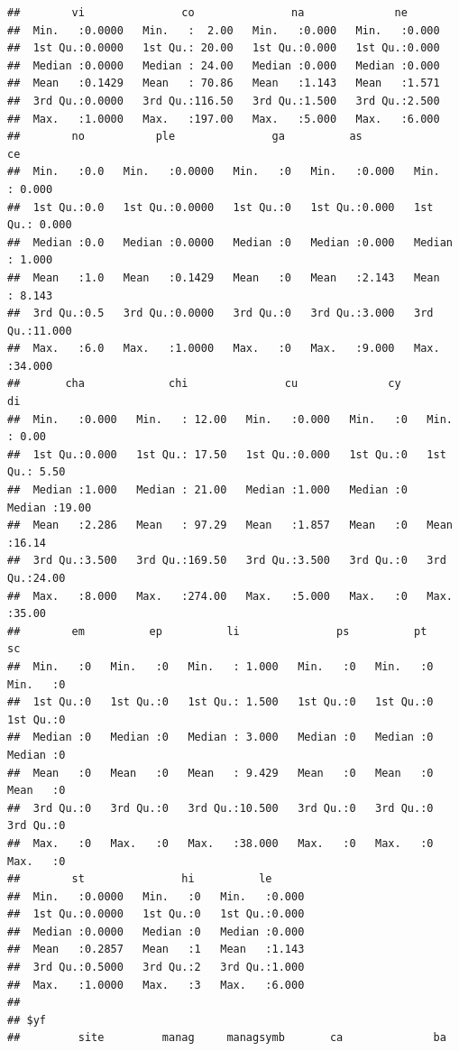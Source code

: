 \documentclass[
]{article}
\begin{document}
\begin{verbatim}
##        vi               co               na              ne       
##  Min.   :0.0000   Min.   :  2.00   Min.   :0.000   Min.   :0.000  
##  1st Qu.:0.0000   1st Qu.: 20.00   1st Qu.:0.000   1st Qu.:0.000  
##  Median :0.0000   Median : 24.00   Median :0.000   Median :0.000  
##  Mean   :0.1429   Mean   : 70.86   Mean   :1.143   Mean   :1.571  
##  3rd Qu.:0.0000   3rd Qu.:116.50   3rd Qu.:1.500   3rd Qu.:2.500  
##  Max.   :1.0000   Max.   :197.00   Max.   :5.000   Max.   :6.000  
##        no           ple               ga          as              ce        
##  Min.   :0.0   Min.   :0.0000   Min.   :0   Min.   :0.000   Min.   : 0.000  
##  1st Qu.:0.0   1st Qu.:0.0000   1st Qu.:0   1st Qu.:0.000   1st Qu.: 0.000  
##  Median :0.0   Median :0.0000   Median :0   Median :0.000   Median : 1.000  
##  Mean   :1.0   Mean   :0.1429   Mean   :0   Mean   :2.143   Mean   : 8.143  
##  3rd Qu.:0.5   3rd Qu.:0.0000   3rd Qu.:0   3rd Qu.:3.000   3rd Qu.:11.000  
##  Max.   :6.0   Max.   :1.0000   Max.   :0   Max.   :9.000   Max.   :34.000  
##       cha             chi               cu              cy          di       
##  Min.   :0.000   Min.   : 12.00   Min.   :0.000   Min.   :0   Min.   : 0.00  
##  1st Qu.:0.000   1st Qu.: 17.50   1st Qu.:0.000   1st Qu.:0   1st Qu.: 5.50  
##  Median :1.000   Median : 21.00   Median :1.000   Median :0   Median :19.00  
##  Mean   :2.286   Mean   : 97.29   Mean   :1.857   Mean   :0   Mean   :16.14  
##  3rd Qu.:3.500   3rd Qu.:169.50   3rd Qu.:3.500   3rd Qu.:0   3rd Qu.:24.00  
##  Max.   :8.000   Max.   :274.00   Max.   :5.000   Max.   :0   Max.   :35.00  
##        em          ep          li               ps          pt          sc   
##  Min.   :0   Min.   :0   Min.   : 1.000   Min.   :0   Min.   :0   Min.   :0  
##  1st Qu.:0   1st Qu.:0   1st Qu.: 1.500   1st Qu.:0   1st Qu.:0   1st Qu.:0  
##  Median :0   Median :0   Median : 3.000   Median :0   Median :0   Median :0  
##  Mean   :0   Mean   :0   Mean   : 9.429   Mean   :0   Mean   :0   Mean   :0  
##  3rd Qu.:0   3rd Qu.:0   3rd Qu.:10.500   3rd Qu.:0   3rd Qu.:0   3rd Qu.:0  
##  Max.   :0   Max.   :0   Max.   :38.000   Max.   :0   Max.   :0   Max.   :0  
##        st               hi          le       
##  Min.   :0.0000   Min.   :0   Min.   :0.000  
##  1st Qu.:0.0000   1st Qu.:0   1st Qu.:0.000  
##  Median :0.0000   Median :0   Median :0.000  
##  Mean   :0.2857   Mean   :1   Mean   :1.143  
##  3rd Qu.:0.5000   3rd Qu.:2   3rd Qu.:1.000  
##  Max.   :1.0000   Max.   :3   Max.   :6.000  
## 
## $yf
##         site         manag     managsymb       ca              ba        

\end{verbatim}
\end{document}
